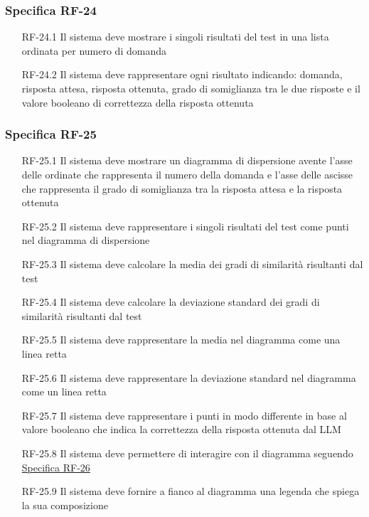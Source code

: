 \subsubsection{Specifica RF-24}
\label{subsubsec:RF-24}
\begin{enumerate}
    \item[RF-24.1] Il sistema deve mostrare i singoli risultati del test in una lista ordinata per numero di domanda
    \item[RF-24.2] Il sistema deve rappresentare ogni risultato indicando: domanda, risposta attesa, risposta ottenuta, grado di somiglianza tra le due risposte e il valore booleano di correttezza della risposta ottenuta
\end{enumerate}

\subsubsection{Specifica RF-25}
\label{subsubsec:RF-25}
\begin{enumerate}
    \item[RF-25.1] Il sistema deve mostrare un diagramma di dispersione avente l'asse delle ordinate che rappresenta il numero della
     domanda e l'asse delle ascisse che rappresenta il grado di somiglianza tra la risposta attesa e la risposta ottenuta
    \item[RF-25.2] Il sistema deve rappresentare i singoli risultati del test come punti nel diagramma di dispersione 
    \item[RF-25.3] Il sistema deve calcolare la media dei gradi di similarità risultanti dal test
    \item[RF-25.4] Il sistema deve calcolare la deviazione standard dei gradi di similarità risultanti dal test
    \item[RF-25.5] Il sistema deve rappresentare la media nel diagramma come una linea retta
    \item[RF-25.6] Il sistema deve rappresentare la deviazione standard nel diagramma come un linea retta
    \item[RF-25.7] Il sistema deve rappresentare i punti in modo differente in base al valore booleano che indica la correttezza della risposta ottenuta dal LLM
    \item[RF-25.8] Il sistema deve permettere di interagire con il diagramma seguendo \hyperref[subsubsec:RF-26]{Specifica RF-26}
    \item[RF-25.9] Il sistema deve fornire a fianco al diagramma una legenda che spiega la sua composizione
\end{enumerate}

